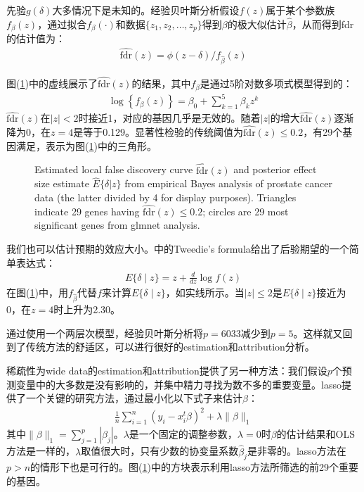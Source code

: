 \documentclass[lang=cn,11pt,a4paper,cite=authoryear]{elegantpaper}
\begin{document}
先验$g(\delta)$大多情况下是未知的。经验贝叶斯分析假设$f(z)$属于某个参数族$f_{\beta}(z)$，通过拟合$f_{\beta}(\cdot)$和数据$\{z_1, z_2, \ldots, z_p \}$得到$\beta$的极大似估计$\hat{\beta}$，从而得到fdr的估计值为：
\begin{align}
\widehat{\text{fdr}}(z)=\phi(z-\delta) / f_{\hat{\beta}}(z)
\end{align}

图(\ref{fig14})中的虚线展示了$\widehat{\text{fdr}}(z)$的结果，其中$f_{\beta}$是通过5阶对数多项式模型得到的：
\begin{align}
\log \left\{f_{\beta}(z)\right\}=\beta_{0}+\sum_{k=1}^{5} \beta_{k} z^{k}
\end{align}
$\widehat{\text{fdr}}(z)$在$|z| < 2$时接近1，对应的基因几乎是无效的。随着$|z|$的增大$\widehat{\text{fdr}}(z)$逐渐降为0，在$z=4$是等于0.129。显著性检验的传统阈值为$\widehat{\text{fdr}}(z) \leq 0.2$，有29个基因满足，表示为图(\ref{fig14})中的三角形。
\begin{figure}[H]
		\centering
		\caption{Estimated local false discovery curve $\widehat{\text{fdr}}(z)$ and posterior effect size estimate $\hat{E}\{\delta | z\}$ from empirical Bayes analysis of prostate cancer data (the latter divided by 4 for display purposes). Triangles indicate 29 genes having $\widehat{\text{fdr}}(z) \leq 0.2$; circles are 29 most significant genes from glmnet analysis.}
		\label{fig14}
\end{figure}

我们也可以估计预期的效应大小。\cite{efron2011tweedie}中的Tweedie's formula给出了后验期望的一个简单表达式：
\begin{align}
E\{\delta \mid z\}=z+\frac{d}{d z} \log f(z)
\end{align}
在图(\ref{fig14})中，用$f_{\hat{\beta}}$代替$f$来计算$E\{\delta \mid z\}$，如实线所示。当$|z| \leq 2$是$E\{\delta \mid z\}$接近为0，在$z=4$时上升为2.30。

通过使用一个两层次模型，经验贝叶斯分析将$p=6033$减少到$p=5$。这样就又回到了传统方法的舒适区，可以进行很好的estimation和attribution分析。

稀疏性为wide data的estimation和attribution提供了另一种方法：我们假设$p$个预测变量中的大多数是没有影响的，并集中精力寻找为数不多的重要变量。lasso提供了一个关键的研究方法，通过最小化以下式子来估计$\beta$：
\begin{align}
\frac{1}{n} \sum_{i=1}^{n}\left(y_{i}-x_{i}^{t} \beta\right)^{2}+\lambda\|\beta\|_{1}
\end{align}
其中$\|\beta\|_{1}=\sum_{j=1}^{p}\left|\beta_{j}\right|$。$\lambda$是一个固定的调整参数，$\lambda=0$时$\beta$的估计结果和OLS方法是一样的，$\lambda$取值很大时，只有少数的协变量系数$\hat{\beta}_j$是非零的。lasso方法在$p > n$的情形下也是可行的。图(\ref{fig14})中的方块表示利用lasso方法所筛选的前29个重要的基因。
\end{document}
